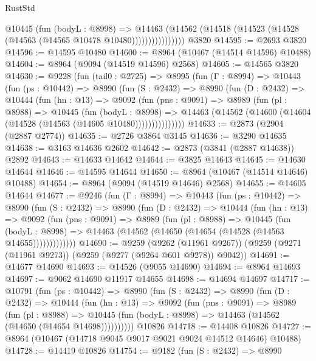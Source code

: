 \begin{lexlean}{RustStd}
\begin{coremodule}
                    @10445
                      (fun (bodyL : @8998) =>
                      @14463
                        (@14562
                          (@14518 (@14523 (@14528 (@14563 (@14565 @10478 @10480))))))))))))))))
    @3820
@14595 := @2693 @3820
@14596 := @14595 @10480
@14600 := @8964 (@10467 (@14514 @14596) @10488)
@14604 := @8964 (@9094 (@14519 @14596) @2568)
@14605 := @14565 @3820
@14630 := @9228
    (fun (tail0 : @2725) =>
    @8995
      (fun (Γ : @8994) =>
      @10443
        (fun (ps : @10442) =>
        @8990
          (fun (S : @2432) =>
          @8990
            (fun (D : @2432) =>
            @10444
              (fun (hn : @13) =>
              @9092
                (fun (pns : @9091) =>
                @8989
                  (fun (pl : @8988) =>
                  @10445
                    (fun (bodyL : @8998) =>
                    @14463 (@14562 (@14600 (@14604 (@14528 (@14563 (@14605 @10480)))))))))))))))
@14633 := @2873 (@2904 (@2887 @2774))
@14635 := @2726 @3864 @3145
@14636 := @3290 @14635
@14638 := @3163 @14636 @2602
@14642 := @2873 (@3841 (@2887 @14638)) @2892
@14643 := @14633 @14642
@14644 := @3825 @14643
@14645 := @14630 @14644
@14646 := @14595 @14644
@14650 := @8964 (@10467 (@14514 @14646) @10488)
@14654 := @8964 (@9094 (@14519 @14646) @2568)
@14655 := @14605 @14644
@14677 := @9246
    (fun (Γ : @8994) =>
    @10443
      (fun (ps : @10442) =>
      @8990
        (fun (S : @2432) =>
        @8990
          (fun (D : @2432) =>
          @10444
            (fun (hn : @13) =>
            @9092
              (fun (pns : @9091) =>
              @8989
                (fun (pl : @8988) =>
                @10445
                  (fun (bodyL : @8998) =>
                  @14463 (@14562 (@14650 (@14654 (@14528 (@14563 @14655)))))))))))))
@14690 := @9259
    (@9262 (@11961 @9267))
    (@9259 (@9271 (@11961 @9273)) (@9259 (@9277 (@9264 @601 @9278)) @9042))
@14691 := @14677 @14690
@14693 := @14526 (@9055 @14690)
@14694 := @8964 @14693
@14697 := @9062 @14690 @11917 @14655
@14698 := @14694 @14697
@14717 := @10791
    (fun (ps : @10442) =>
    @8990
      (fun (S : @2432) =>
      @8990
        (fun (D : @2432) =>
        @10444
          (fun (hn : @13) =>
          @9092
            (fun (pns : @9091) =>
            @8989
              (fun (pl : @8988) =>
              @10445 (fun (bodyL : @8998) => @14463 (@14562 (@14650 (@14654 @14698))))))))))
    @10826
@14718 := @14408 @10826
@14727 := @8964 (@10467 (@14718 @9045 @9017 @9021 @9024 @14512 @14646) @10488)
@14728 := @14419 @10826
@14754 := @9182
    (fun (S : @2432) =>
    @8990

\end{coremodule}
\end{lexlean}
